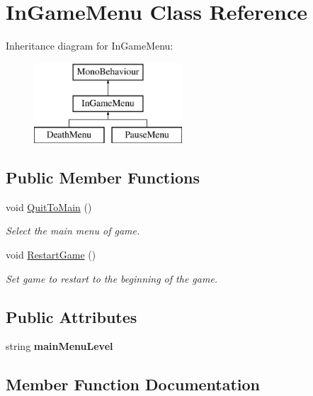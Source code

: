 \hypertarget{class_in_game_menu}{}\section{In\+Game\+Menu Class Reference}
\label{class_in_game_menu}
Inheritance diagram for In\+Game\+Menu\+:\begin{figure}[H]
\begin{center}
\leavevmode
\includegraphics[height=3.000000cm]{class_in_game_menu}
\end{center}
\end{figure}
\subsection*{Public Member Functions}
\begin{DoxyCompactItemize}
\item 
void \hyperlink{class_in_game_menu_ac343f26c1a578315a6e1887d9c45a99d}{Quit\+To\+Main} ()
\begin{DoxyCompactList}\small\item\em Select the main menu of game. \end{DoxyCompactList}\item 
void \hyperlink{class_in_game_menu_a5673b1a965bea0c59e6fd43a0655e8b8}{Restart\+Game} ()
\begin{DoxyCompactList}\small\item\em Set game to restart to the beginning of the game. \end{DoxyCompactList}\end{DoxyCompactItemize}
\subsection*{Public Attributes}
\begin{DoxyCompactItemize}
\item 
\hypertarget{class_in_game_menu_ad1cdfd1ae90375e21aa00c538595a951}{}\label{class_in_game_menu_ad1cdfd1ae90375e21aa00c538595a951} 
string {\bfseries main\+Menu\+Level}
\end{DoxyCompactItemize}


\subsection{Member Function Documentation}
\hypertarget{class_in_game_menu_ac343f26c1a578315a6e1887d9c45a99d}{}\label{class_in_game_menu_ac343f26c1a578315a6e1887d9c45a99d} 
